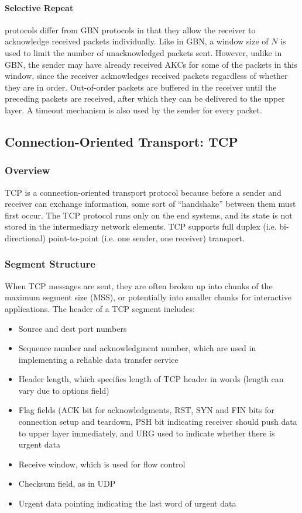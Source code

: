 \documentclass[12pt,titlepage]{article}
\begin{document}
        \paragraph{Selective Repeat} protocols differ from GBN protocols in that they allow the receiver to acknowledge received packets individually. Like in GBN, a window size of $N$
        is used to limit the number of unacknowledged packets sent. However, unlike in GBN, the sender may have already received AKCs for some of the packets in this window, since the
        receiver acknowledges received packets regardless of whether they are in order. Out-of-order packets are buffered in the receiver until the preceding packets are received, after
        which they can be delivered to the upper layer. A timeout mechanism is also used by the sender for every packet.

    \subsection{Connection-Oriented Transport: TCP}

      \subsubsection{Overview}
        TCP is a connection-oriented transport protocol because before a sender and receiver can exchange information, some sort of ``handshake'' between them must first occur. The TCP
        protocol runs only on the end systems, and its state is not stored in the intermediary network elements. TCP supports full duplex (i.e. bi-directional) point-to-point
        (i.e. one sender, one receiver) transport.

      \subsubsection{Segment Structure}
        When TCP messages are sent, they are often broken up into chunks of the maximum segment size (MSS), or potentially into smaller chunks for interactive applications. The header
        of a TCP segment includes:
        \begin{itemize}
          \item Source and dest port numbers
          \item Sequence number and acknowledgment number, which are used in implementing a reliable data transfer service
          \item Header length, which specifies length of TCP header in words (length can vary due to options field)
          \item Flag fields (ACK bit for acknowledgments, RST, SYN and FIN bits for connection setup and teardown, PSH bit indicating receiver should push data to upper layer immediately,  
            and URG used to indicate whether there is urgent data
          \item Receive window, which is used for flow control
          \item Checksum field, as in UDP
          \item Urgent data pointing indicating the last word of urgent data
        \end{itemize}
\end{document}
